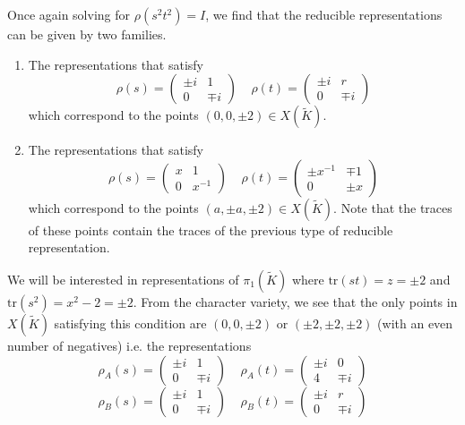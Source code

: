 \documentclass{article}
\theoremstyle{plain}
\theoremstyle{definition}
\theoremstyle{plain}
\theoremstyle{plain}
\theoremstyle{plain}
\theoremstyle{remark}
\theoremstyle{remark}
\theoremstyle{plain}
\theoremstyle{plain}
\begin{document}
Once again solving for $\rho(s^2t^2) = I$, we find that the reducible representations can be given by two families. 
\begin{enumerate}
	\item The representations that satisfy\begin{equation}
		\rho(s) = \begin{pmatrix}\pm i&1\\0&\mp i\end{pmatrix} \ \ \ \ \ \rho(t) = \begin{pmatrix}\pm i&r\\0&\mp i\end{pmatrix}
	\end{equation}
	which correspond to the points $(0, 0, \pm 2) \in X(\tilde{K})$. 
	\item The representations that satisfy \begin{equation}
		\rho(s) = \begin{pmatrix}x&1\\0&x^{-1}\end{pmatrix} \ \ \ \ \ \rho(t) = \begin{pmatrix}\pm x^{-1}&\mp1\\0&\pm x\end{pmatrix}
	\end{equation}
	which correspond to the points $(a, \pm a, \pm 2) \in X(\tilde{K})$. Note that the traces of these points contain the traces of the previous type of reducible representation.
\end{enumerate}
We will be interested in representations of $\pi_1(\tilde{K})$ where $\text{tr}(st) = z = \pm 2$ and $\text{tr}(s^2) = x^2 - 2 = \pm 2$. From the character variety, we see that the only points in $X(\tilde{K})$ satisfying this condition are $(0, 0, \pm 2)$ or $(\pm2, \pm2, \pm2)$ (with an even number of negatives) i.e. the representations 
\begin{equation}
	\rho_A(s) = \begin{pmatrix}\pm i&1\\0&\mp i\end{pmatrix} \ \ \ \ \ \rho_A(t) = \begin{pmatrix}\pm i&0\\4&\mp i\end{pmatrix}
\end{equation}
\begin{equation}
	\rho_B(s) = \begin{pmatrix}\pm i&1\\0&\mp i\end{pmatrix} \ \ \ \ \ \rho_B(t) = \begin{pmatrix}\pm i&r\\0&\mp i\end{pmatrix}
\end{equation}
\end{document}
